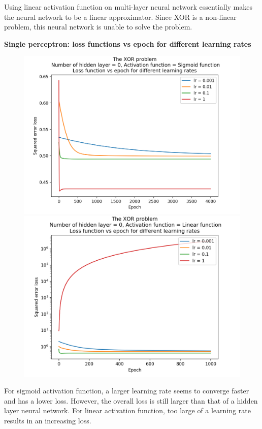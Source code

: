 \documentclass[12pt]{amsart}
\begin{document}
Using linear activation function on multi-layer neural network essentially makes the neural network to be a linear approximator. Since XOR is a non-linear problem, this neural network is unable to solve the problem.


\pagebreak
\textbf{Single perceptron: loss functions vs epoch for different learning rates}

\begin{figure}[h]
\includegraphics[width=0.49\columnwidth]{xor_sigmoid_mse_lrs_perceptron.png}
\includegraphics[width=0.49\columnwidth]{xor_linear_mse_lrs_perceptron.png}
\end{figure}

For sigmoid activation function, a larger learning rate seems to converge faster and has a lower loss. However, the overall loss is still larger than that of a hidden layer neural network. For linear activation function, too large of a learning rate results in an increasing loss. \\
\end{document}

